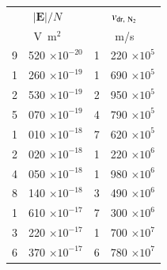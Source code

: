 \documentclass{warpdoc}
\renewcommand{\fontsizetable}{\footnotesize\scalefont{1.0}}
\renewcommand{\vec}[1]{\bm{#1}}
\begin{document}
%
\begin{table}
  \center\fontsizetable
    \label{tab:electrondriftvelocities}
    \fontsizetable
    \begin{tabular}{r@{.}lr@{.}l}
    \toprule
    \multicolumn{2}{c}{$|\vec{E}|/N$}  & \multicolumn{2}{c}{${v_{\rm dr,~N_2}}$}  \\
    \multicolumn{2}{c}{V~m$^2$}  & \multicolumn{2}{c}{m/s} \\
    \midrule
    9&520 $\times 10^{-20}$  &  1&220 $\times 10^{5}$ \\
    1&260 $\times 10^{-19}$  &  1&690 $\times 10^{5}$ \\
    2&530 $\times 10^{-19}$  &  2&950 $\times 10^{5}$ \\
    5&070 $\times 10^{-19}$  &  4&790 $\times 10^{5}$ \\
    1&010 $\times 10^{-18}$  &  7&620 $\times 10^{5}$ \\
    2&020 $\times 10^{-18}$  &  1&220 $\times 10^{6}$ \\
    4&050 $\times 10^{-18}$  &  1&980 $\times 10^{6}$ \\
    8&140 $\times 10^{-18}$  &  3&490 $\times 10^{6}$ \\
    1&610 $\times 10^{-17}$  &  7&300 $\times 10^{6}$ \\
    3&220 $\times 10^{-17}$  &  1&700 $\times 10^{7}$ \\
    6&370 $\times 10^{-17}$  &  6&780 $\times 10^{7}$ \\         
    \bottomrule
    \end{tabular}
\end{table}
%
\end{document}
